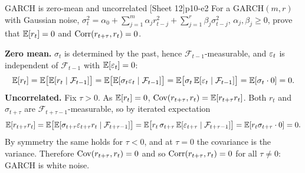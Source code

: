 \begin{exercise}{GARCH is zero-mean and uncorrelated \quad\textnormal{[Sheet 12]}}{p10-e2}
For a $\mathrm{GARCH}(m,r)$ with Gaussian noise,
$\sigma_t^2=\alpha_0+\sum_{j=1}^{m}\alpha_j r_{t-j}^2+\sum_{j=1}^{r}\beta_j\sigma_{t-j}^2$,
$\alpha_j,\beta_j\ge0$, prove that $\mathbb{E}[r_t]=0$ and $\operatorname{Corr}(r_{t+\tau},r_t)=0$.
\end{exercise}
\begin{solution}
\textbf{Zero mean.} $\sigma_t$ is determined by the past, hence
$\mathcal F_{t-1}$-measurable, and $\varepsilon_t$ is independent of $\mathcal F_{t-1}$
with $\mathbb{E}[\varepsilon_t]=0$:
\[
\mathbb{E}[r_t]=\mathbb{E}\big[\mathbb{E}[r_t\mid\mathcal F_{t-1}]\big]
=\mathbb{E}\big[\mathbb{E}[\sigma_t\varepsilon_t\mid\mathcal F_{t-1}]\big]
=\mathbb{E}\big[\sigma_t\,\mathbb{E}[\varepsilon_t\mid\mathcal F_{t-1}]\big]
=\mathbb{E}[\sigma_t\cdot0]=0 .
\]
\textbf{Uncorrelated.} Fix $\tau>0$. As $\mathbb{E}[r_t]=0$,
$\operatorname{Cov}(r_{t+\tau},r_t)=\mathbb{E}[r_{t+\tau}r_t]$. Both $r_t$ and $\sigma_{t+\tau}$ are
$\mathcal F_{t+\tau-1}$-measurable, so by iterated expectation
\[
\mathbb{E}[r_{t+\tau}r_t]
=\mathbb{E}\big[\mathbb{E}[\sigma_{t+\tau}\varepsilon_{t+\tau}r_t\mid\mathcal F_{t+\tau-1}]\big]
=\mathbb{E}\big[r_t\,\sigma_{t+\tau}\,\mathbb{E}[\varepsilon_{t+\tau}\mid\mathcal F_{t+\tau-1}]\big]
=\mathbb{E}[r_t\sigma_{t+\tau}\cdot0]=0 .
\]
By symmetry the same holds for $\tau<0$, and at $\tau=0$ the covariance is the
variance. Therefore $\operatorname{Cov}(r_{t+\tau},r_t)=0$ and so $\operatorname{Corr}(r_{t+\tau},r_t)=0$ for
all $\tau\ne0$: GARCH is white noise.
\end{solution}

